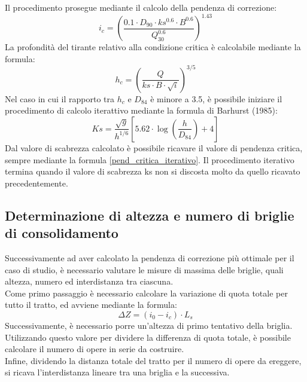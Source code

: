 Il procedimento prosegue mediante il calcolo della pendenza di correzione:
\begin{equation}
    i_c = \left(\frac{0.1 \cdot D_{90} \cdot ks^{0.6} \cdot B^{0.6}}{Q^{0.6}_{30}} \right) ^{1.43}
    \label{pend_critica_iterativo}
\end{equation}
La profondità del tirante relativo alla condizione critica è calcolabile mediante la formula:
\begin{equation}
    h_c = \left( \frac{Q}{ks \cdot B \cdot \sqrt{i}}\right)^{3/5}
\end{equation}
Nel caso in cui il rapporto tra $h_c$ e $D_{84}$ è minore a 3.5, è possibile iniziare il procedimento di calcolo iterattivo mediante la formula di Barhurst (1985):
\begin{equation}
    Ks= \frac{\sqrt{g}}{h^{1/6}} \left[5.62 \cdot \log \left(\frac{h}{D_{84}}\right)+4\right]
\end{equation}
Dal valore di scabrezza calcolato è possibile ricavare il valore di pendenza critica, sempre mediante la formula \ref{pend_critica_iterativo}. Il procedimento iterativo termina quando il valore di scabrezza ks non si discosta molto da quello ricavato precedentemente.

\subsection{Determinazione di altezza e numero di briglie di consolidamento}
Successivamente ad aver calcolato la pendenza di correzione più ottimale per il caso di studio, è necessario valutare le misure di massima delle briglie, quali altezza, numero ed interdistanza tra ciascuna.\\
Come primo passaggio è necessario calcolare la variazione di quota totale per tutto il tratto, ed avviene mediante la formula:
\begin{equation}
    \Delta Z = (i_0 - i_c) \cdot L_s
\end{equation}
Successivamente, è necessario porre un'altezza di primo tentativo della briglia. Utilizzando questo valore per dividere la differenza di quota totale, è possibile calcolare il numero di opere in serie da costruire.\\
Infine, dividendo la distanza totale del tratto per il numero di opere da ereggere, si ricava l'interdistanza lineare tra una briglia e la successiva.

